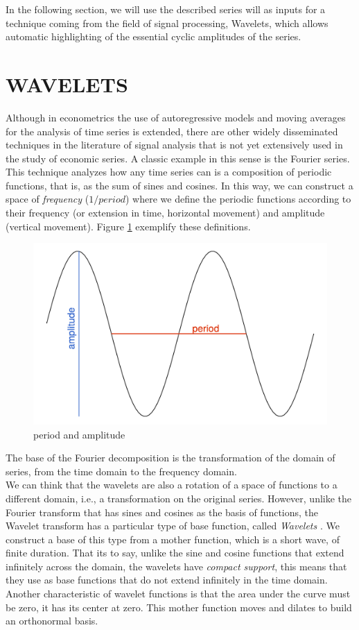 \documentclass[a4paper,10cpi]{article}
\begin{document}
	
	In the following section, we will use the described series will as inputs for a technique coming from the field of signal processing, Wavelets, which allows automatic highlighting of the essential cyclic amplitudes of the series.
	
	\section{\uppercase{\textbf{\normalsize{Wavelets}}}}
	
	Although in econometrics the use of autoregressive models and moving averages for the analysis of time series is extended, there are other widely disseminated techniques in the literature of signal analysis that is not yet extensively used in the study of economic series. A classic example in this sense is the Fourier series. This technique analyzes how any time series can is a composition of periodic functions, that is, as the sum of sines and cosines. In this way, we can construct a space of \textit{frequency} ($1/period$) where we define the periodic functions according to their frequency (or extension in time, horizontal movement) and amplitude (vertical movement). Figure \ref{fig:ciclo} exemplify these definitions.
	
	
	\begin{figure}[H]
		\centering
		\includegraphics[width=0.65\linewidth]{ciclo_en.png}
		\caption{period and amplitude} \label{fig:ciclo}
	\end{figure}
	
	The base of the Fourier decomposition is the transformation of the domain of series, from the time domain to the frequency domain.
	\\
	
	We can think that the wavelets are also a rotation of a space of functions to a different domain, i.e., a transformation on the original series. However, unlike the Fourier transform that has sines and cosines as the basis of functions, the Wavelet transform has a particular type of base function, called \textit{Wavelets} \cite{castro1995wavelets}. We construct a base of this type from a mother function, which is a short wave, of finite duration. That its to say, unlike the sine and cosine functions that extend infinitely across the domain, the wavelets have \textit{compact support}, this means that they use as base functions that do not extend infinitely in the time domain. Another characteristic of wavelet functions is that the area under the curve must be zero, it has its center at zero. This mother function moves and dilates to build an orthonormal basis.
	
\end{document}
